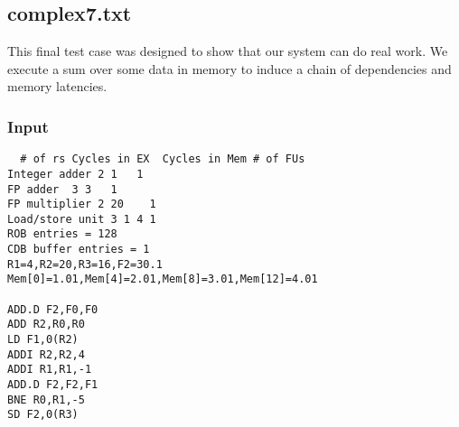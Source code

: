 \documentclass[12pt]{article}
\begin{document}
\subsection{complex7.txt}
This final test case was designed to show that our system can do real work.  We execute a sum over some data in memory to induce a chain of dependencies and memory latencies.

\subsubsection*{Input}
\begin{verbatim}
  # of rs Cycles in EX  Cycles in Mem # of FUs
Integer adder 2 1   1
FP adder  3 3   1
FP multiplier 2 20    1
Load/store unit 3 1 4 1
ROB entries = 128
CDB buffer entries = 1
R1=4,R2=20,R3=16,F2=30.1
Mem[0]=1.01,Mem[4]=2.01,Mem[8]=3.01,Mem[12]=4.01

ADD.D F2,F0,F0
ADD R2,R0,R0
LD F1,0(R2)
ADDI R2,R2,4
ADDI R1,R1,-1
ADD.D F2,F2,F1
BNE R0,R1,-5
SD F2,0(R3)
\end{verbatim}
\end{document}
